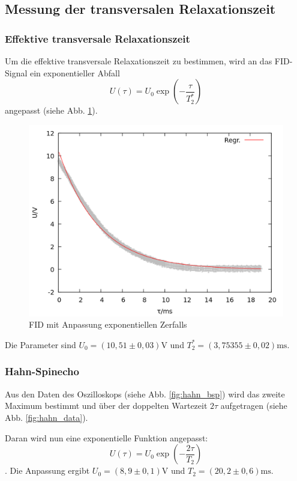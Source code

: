 \subsection{Messung der transversalen Relaxationszeit}
\subsubsection{Effektive transversale Relaxationszeit}
Um die effektive transversale Relaxationszeit zu bestimmen, wird an das FID-Signal ein exponentieller Abfall $$U(\tau) = U_0\exp{\left(-\frac{\tau}{T_2^*}\right)}$$ angepasst (siehe Abb. \ref{fig:hahn_fid}).

\begin{figure}[h]
\centering
\includegraphics[width=0.75\linewidth]{data/p402_443_data/hahn_sequenz/out_fid.png}
\caption{FID mit Anpassung exponentiellen Zerfalls}
\label{fig:hahn_fid}
\end{figure}

Die Parameter sind $U_0 = (10,51\pm 0,03)\si{\volt}$ und $T_2^* = (3,75355\pm 0,02) \si{\milli\second}$. 

\subsubsection{Hahn-Spinecho}
Aus den Daten des Oszilloskops (siehe Abb. \ref{fig:hahn_bsp}) wird das zweite Maximum bestimmt und über der doppelten Wartezeit $2\tau$ aufgetragen (siehe Abb. \ref{fig:hahn_data}).

Daran wird nun eine exponentielle Funktion angepasst: $$U(\tau) = U_0\exp{\left(-\frac{2\tau}{T_2}\right)}$$. Die Anpassung ergibt $U_0 = (8,9\pm 0,1)\si{\volt}$ und $T_2 = (20,2\pm 0,6) \si{\milli\second}$.

